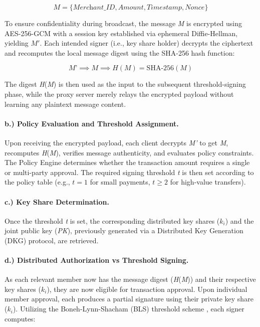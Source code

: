 \documentclass[a4paper]{scl-article}
\begin{document}
\[
\textit{M} = \{\textit{Merchant\_ID}, \textit{Amount}, \textit{Timestamp}, \textit{Nonce}\}
\]

To ensure confidentiality during broadcast, the message \textit{M} is encrypted using AES-256-GCM with a session key established via ephemeral Diffie-Hellman, yielding \textit{$M'$}. Each intended signer (i.e., key share holder) decrypts the ciphertext and recomputes the local message digest using the SHA-256 hash function:

\[
\textit{M'} \implies \textit{M} \implies H(\textit{M}) = \text{SHA-256}(\textit{M})
\]

The digest \textit{H}(\textit{M}) is then used as the input to the subsequent threshold-signing phase, while the proxy server merely relays the encrypted payload without learning any plaintext message content.

\paragraph{b.) Policy Evaluation and Threshold Assignment.}
Upon receiving the encrypted payload, each client decrypts \textit{M'} to get \textit{M}, recomputes \textit{H}(\textit{M}), verifies message authenticity, and evaluates policy constraints. The Policy Engine determines whether the transaction amount requires a single or multi-party approval. The required signing threshold \textit{t} is then set according to the policy table (e.g., $t=1$ for small payments, $t\ge2$ for high-value transfers).

\paragraph{c.) Key Share Determination.}
Once the threshold \textit{t} is set, the corresponding distributed key shares ($k_i$) and the joint public key (\textit{PK}), previously generated via a Distributed Key Generation (DKG) protocol, are retrieved.

\paragraph{d.) Distributed Authorization vs Threshold Signing.}
As each relevant member now has the message digest (\textit{H}(\textit{M})) and their respective key shares ($k_i$), they are now eligible for transaction approval. Upon individual member approval, each produces a partial signature using their private key share ($k_i$). Utilizing the Boneh-Lynn-Shacham (BLS) threshold scheme \cite{boneh2001}, each signer computes:
\end{document}
